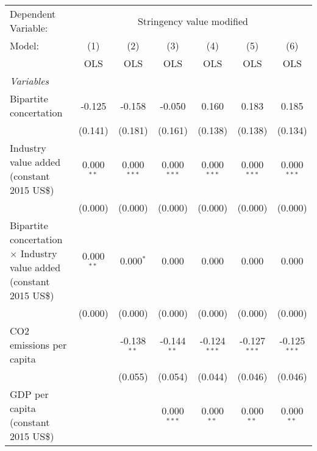 
\begingroup
\centering
\begin{tabular}{lcccccc}
   \toprule
   Dependent Variable: & \multicolumn{6}{c}{Stringency value modified}\\
   Model:                                                                      & (1)          & (2)           & (3)           & (4)            & (5)            & (6)\\  
                                                                               &  OLS         & OLS           & OLS           & OLS            & OLS            & OLS\\  
   \midrule
   \emph{Variables}\\
   Bipartite concertation                                                      & -0.125       & -0.158        & -0.050        & 0.160          & 0.183          & 0.185\\   
                                                                               & (0.141)      & (0.181)       & (0.161)       & (0.138)        & (0.138)        & (0.134)\\   
   Industry value added (constant 2015 US\$)                                   & 0.000$^{**}$ & 0.000$^{***}$ & 0.000$^{***}$ & 0.000$^{***}$  & 0.000$^{***}$  & 0.000$^{***}$\\   
                                                                               & (0.000)      & (0.000)       & (0.000)       & (0.000)        & (0.000)        & (0.000)\\   
   Bipartite concertation $\times$ Industry value added (constant 2015 US\$)   & 0.000$^{**}$ & 0.000$^{*}$   & 0.000         & 0.000          & 0.000          & 0.000\\   
                                                                               & (0.000)      & (0.000)       & (0.000)       & (0.000)        & (0.000)        & (0.000)\\   
   CO2 emissions per capita                                                    &              & -0.138$^{**}$ & -0.144$^{**}$ & -0.124$^{***}$ & -0.127$^{***}$ & -0.125$^{***}$\\   
                                                                               &              & (0.055)       & (0.054)       & (0.044)        & (0.046)        & (0.046)\\   
   GDP per capita (constant 2015 US\$)                                         &              &               & 0.000$^{***}$ & 0.000$^{**}$   & 0.000$^{**}$   & 0.000$^{**}$\\   

\end{tabular}
